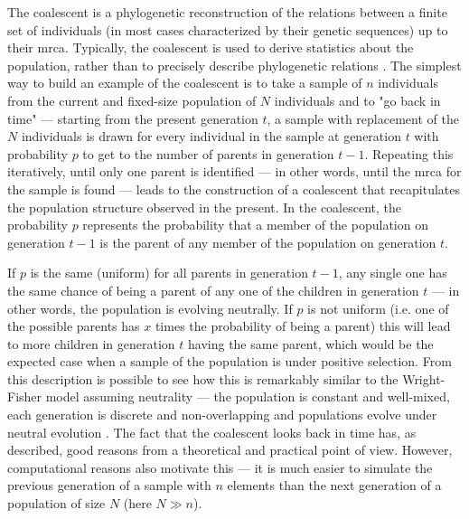 The coalescent is a phylogenetic reconstruction of the relations between a finite set of individuals (in most cases characterized by their genetic sequences) up to their \ac{mrca}. Typically, the coalescent is used to derive statistics about the population, rather than to precisely describe phylogenetic relations \cite{Gillespie2004-xo}. The simplest way to build an example of the coalescent is to take a sample of $n$ individuals from the current and fixed-size population of $N$ individuals and to "go back in time" --- starting from the present generation $t$, a sample with replacement of the $N$ individuals is drawn for every individual in the sample at generation $t$ with probability $p$ to get to the number of parents in generation $t-1$. Repeating this iteratively, until only one parent is identified --- in other words, until the \ac{mrca} for the sample is found --- leads to the construction of a coalescent that recapitulates the population structure observed in the present. In the coalescent, the probability $p$ represents the probability that a member of the population on generation $t-1$ is the parent of any member of the population on generation $t$.

If $p$ is the same (uniform) for all parents in generation $t-1$, any single one has the same chance of being a parent of any one of the children in generation $t$ --- in other words, the population is evolving neutrally. If $p$ is not uniform (i.e. one of the possible parents has $x$ times the probability of being a parent) this will lead to more children in generation $t$ having the same parent, which would be the expected case when a sample of the population is under positive selection. From this description is possible to see how this is remarkably similar to the Wright-Fisher model assuming neutrality --- the population is constant and well-mixed, each generation is discrete and non-overlapping and populations evolve under neutral evolution \cite{Gillespie2004-xo}. The fact that the coalescent looks back in time has, as described, good reasons from a theoretical and practical point of view. However, computational reasons also motivate this --- it is much easier to simulate the previous generation of a sample with $n$ elements than the next generation of a population of size $N$ (here $N \gg n$).

